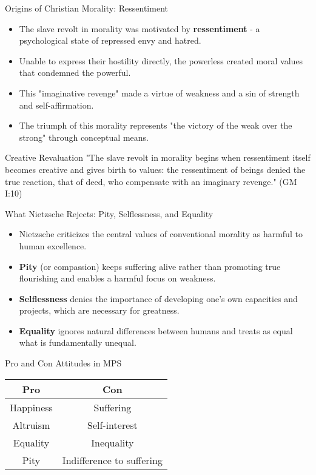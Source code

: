 \documentclass{beamer}
\begin{document}
\begin{frame}{Origins of Christian Morality: Ressentiment}
\begin{itemize}
\item The slave revolt in morality was motivated by \textbf{ressentiment} - a psychological state of repressed envy and hatred.
\item Unable to express their hostility directly, the powerless created moral values that condemned the powerful.
\item This "imaginative revenge" made a virtue of weakness and a sin of strength and self-affirmation.
\item The triumph of this morality represents "the victory of the weak over the strong" through conceptual means.
\end{itemize}

\begin{alertblock}{Creative Revaluation}
"The slave revolt in morality begins when ressentiment itself becomes creative and gives birth to values: the ressentiment of beings denied the true reaction, that of deed, who compensate with an imaginary revenge." (GM I:10)
\end{alertblock}
\end{frame}


\begin{frame}{What Nietzsche Rejects: Pity, Selflessness, and Equality}
\begin{itemize}
\item Nietzsche criticizes the central values of conventional morality as harmful to human excellence.
\item \textbf{Pity} (or compassion) keeps suffering alive rather than promoting true flourishing and enables a harmful focus on weakness.
\item \textbf{Selflessness} denies the importance of developing one's own capacities and projects, which are necessary for greatness.
\item \textbf{Equality} ignores natural differences between humans and treats as equal what is fundamentally unequal.
\end{itemize}

\begin{block}{Pro and Con Attitudes in MPS}
\begin{center}
\begin{tabular}{|c|c|}
\hline
\textbf{Pro} & \textbf{Con} \\
\hline
Happiness & Suffering \\
Altruism & Self-interest \\
Equality & Inequality \\
Pity & Indifference to suffering \\
\hline
\end{tabular}
\end{center}
\end{block}
\end{frame}
\end{document}

